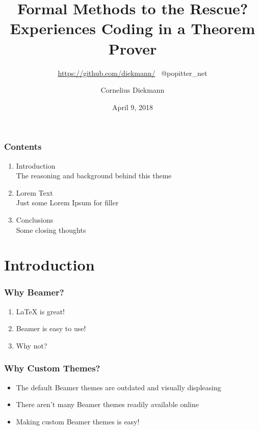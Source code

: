 \documentclass[aspectratio=169]{beamer}
\title{Formal Methods to the Rescue? Experiences Coding in a Theorem Prover}
\subtitle{\url{https://github.com/diekmann/} \  @popitter\_net}
\author{Cornelius Diekmann}
\date{April 9, 2018}
\begin{document}
\setcounter{showProgressBar}{0}
\setcounter{showSlideNumbers}{0}

\frame{\titlepage}

\begin{frame}
	\frametitle{Contents}
	\begin{enumerate}
		\item Introduction \\ \textcolor{ExecusharesGrey}{\footnotesize\hspace{1em} The reasoning and background behind this theme}
		\item Lorem Text  \\ \textcolor{ExecusharesGrey}{\footnotesize\hspace{1em} Just some Lorem Ipsum for filler}
		\item Conclusions \\ \textcolor{ExecusharesGrey}{\footnotesize\hspace{1em} Some closing thoughts}
	\end{enumerate}
\end{frame}


\setcounter{framenumber}{0}
\setcounter{showProgressBar}{1}
\setcounter{showSlideNumbers}{1}
\section{Introduction}

\begin{frame}
	\frametitle{Why Beamer?}
	\begin{enumerate}
		\item LaTeX is great!
		\item Beamer is easy to use!
		\item Why not?
	\end{enumerate}
\end{frame}

\begin{frame}
	\frametitle{Why Custom Themes?}
	\begin{itemize}
		\item The default Beamer themes are outdated and visually displeasing
		\item There aren't many Beamer themes readily available online
		\item Making custom Beamer themes is easy!
	\end{itemize}
\end{frame}
\end{document}
